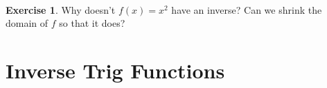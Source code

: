 \documentclass[11pt,reqno,final]{amsart}
\numberwithin{equation}{section}
\numberwithin{figure}{section}
\theoremstyle{definition} %
\newtheorem{exercise}[question]{Exercise}
\begin{document}
$ $

\begin{exercise}
        Why doesn't $f(x) = x^2$ have an inverse?
        Can we shrink the domain of $f$ so that it does?
        \vfill
\end{exercise}

\newpage




\newpage


\section{Inverse Trig Functions}

$ $
\end{document}
